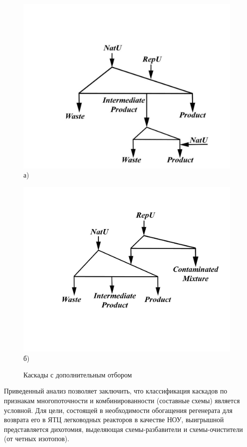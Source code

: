 \begin{figure}[ht]
  \begin{minipage}[b][][b]{0.49\linewidth}\centering
    \includegraphics[width=0.9\linewidth]{cascades/add_p} \\ а)
  \end{minipage}
  \hfill
  \begin{minipage}[b][][b]{0.49\linewidth}\centering
    \includegraphics[width=0.9\linewidth]{cascades/add_p2} \\ б)
  \end{minipage}
  \caption{Каскады с дополнительным отбором}
  \label{fig:add}
\end{figure}

Приведенный анализ позволяет заключить, что классификация каскадов по признакам многопоточности и комбинированности (составные схемы) является условной.
Для цели, состоящей в необходимости обогащения регенерата для возврата его в ЯТЦ легководных реакторов в качестве НОУ, выигрышной представляется дихотомия, выделяющая схемы-разбавители и схемы-очистители (от четных изотопов).

